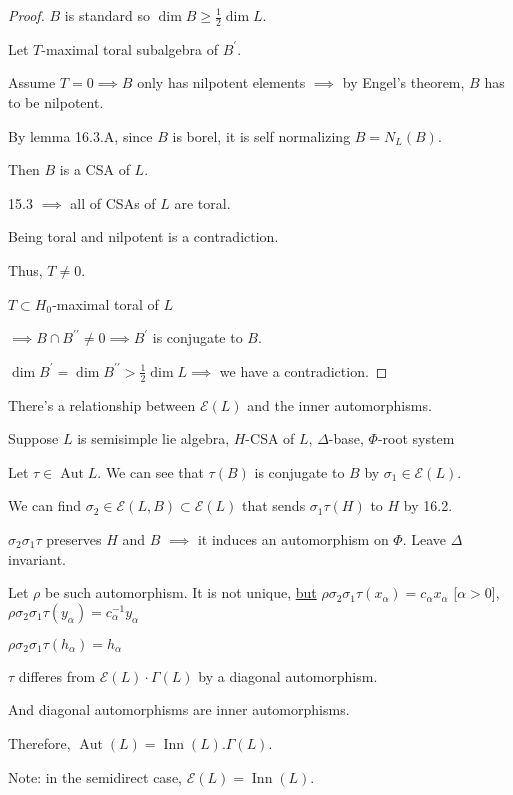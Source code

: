 \documentclass{article}
\theoremstyle{definition}
\begin{document}
\begin{proof}
        \(B\) is standard so \(\dim B \geq \frac{1}{2}\dim L\).

        Let \(T\)-maximal toral subalgebra of \(B^{\prime}\).

        Assume \(T=0 \implies B\) only has nilpotent elements \(\implies\) by Engel's theorem, \(B\) has to be nilpotent.

        By lemma 16.3.A, since \(B\) is borel, it is self normalizing \(B = N_L (B)\).

        Then \(B\) is a CSA of \(L\).

        15.3 \(\implies\) all of CSAs of \(L\) are toral.

        Being toral and nilpotent is a contradiction.

        Thus, \(T\neq 0\).

        \(T \subset H_0\)-maximal toral of \(L\)

        \(\implies B \cap B^{\prime\prime} \neq 0 \implies B^{\prime} \) is conjugate to \(B\).

        \(\dim B^{\prime} = \dim B^{\prime\prime} > \frac{1}{2} \dim L \implies\) we have a contradiction.
    \end{proof}

    There's a relationship between \(\mathscr{E}(L)\) and the inner automorphisms.

    Suppose \(L\) is semisimple lie algebra, \(H\)-CSA of \(L\), \(\Delta\)-base, \(\Phi\)-root system

    Let \(\tau \in \operatorname{Aut} L\). We can see that \(\tau (B)\) is conjugate to \(B\) by \(\sigma_1 \in \mathscr{E} (L)\).

    We can find \(\sigma_2 \in \mathscr{E} (L,B) \subset \mathscr{E} (L)\) that sends \(\sigma_1 \tau (H)\) to \(H\) by 16.2.
    
    \(\sigma_2 \sigma_1 \tau\) preserves \(H\) and \(B\) \(\implies\) it induces an automorphism on \(\Phi\). Leave \(\Delta\) invariant.

    Let \(\rho\) be such automorphism. It is not unique, \underline{but} \(\rho \sigma_2 \sigma_1 \tau (x_\alpha) = c_\alpha x_\alpha\) [\(\alpha > 0\)], \(\rho \sigma_2 \sigma_1 \tau (y_\alpha) = c_\alpha ^{-1} y_\alpha\)

    \(\rho \sigma_2 \sigma_1 \tau (h_\alpha) = h_\alpha\)

    \(\tau\) differes from \(\mathscr{E} (L) \cdot \Gamma(L)\) by a diagonal automorphism.
    
    And diagonal automorphisms are inner automorphisms.

    Therefore, \(\operatorname{Aut} (L) = \operatorname{Inn} (L) . \Gamma(L)\). 

    Note: in the semidirect case, \(\mathscr{E} (L) = \operatorname{Inn} (L)\).
\end{document}

